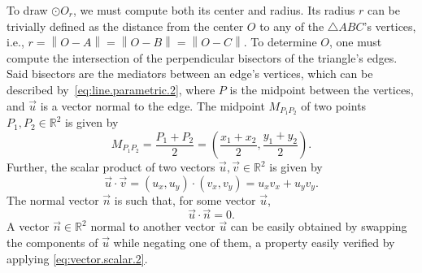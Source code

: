 \begin{comment}
Let $A \in \mathbb{R}^{2 \times 2}$ be the matrix whose columns are the vectors
$\vec{AB} = (a, b)$ and $\vec{AC} = (c, d)$, for instance, such that
%
\begin{equation}\label{eq:matrix.det.2x2}
  \det(A) = \begin{vmatrix}
              a & c\\
              b & d
            \end{vmatrix}%
          = ad - cb
\end{equation}
% 
If the determinant is found to be $0$, then there is no possible solution.
Otherwise, one can proceed to draw $\odot O_r$.
\end{comment}

To draw $\odot O_r$, we must compute both its center and radius.  Its radius $r$
can be trivially defined as the distance from the center $O$ to any of the
$\triangle ABC$'s vertices, i.e., $r = \left\|O - A\right\| = \left\|O -
B\right\| = \left\|O - C\right\|$.  To determine $O$, one must compute the
intersection of the perpendicular bisectors of the triangle's edges.  Said
bisectors are the mediators between an edge's vertices, which can be described
by~\cref{eq:line.parametric.2}, where $P$ is the midpoint between the vertices,
and $\vec{u}$ is a vector normal to the edge.  The midpoint $M_{P_1P_2}$ of two
points $P_1, P_2 \in \mathbb{R}^2$ is given by
\begin{equation}\label{eq:midpoint.2}
  M_{P_1P_2} = \frac{P_1 + P_2}{2}%
             = \left(\frac{x_1 + x_2}{2}, \frac{y_1 + y_2}{2}\right).
\end{equation}
Further, the scalar product of two vectors $\vec{u}, \vec{v} \in \mathbb{R}^2$
is given by
\begin{equation}\label{eq:vector.scalar.2}
  \vec{u} \cdot \vec{v} = (u_x, u_y) \cdot (v_x, v_y) = u_x v_x + u_y v_y.
\end{equation}
The normal vector $\vec{n}$ is such that, for some vector $\vec{u}$,
\[ \vec{u} \cdot \vec{n} = 0. \]
A vector $\vec{n} \in \mathbb{R}^2$ normal to another vector $\vec{u}$ can be
easily obtained by swapping the components of $\vec{u}$ while negating one of
them, a property easily verified by applying \cref{eq:vector.scalar.2}.

